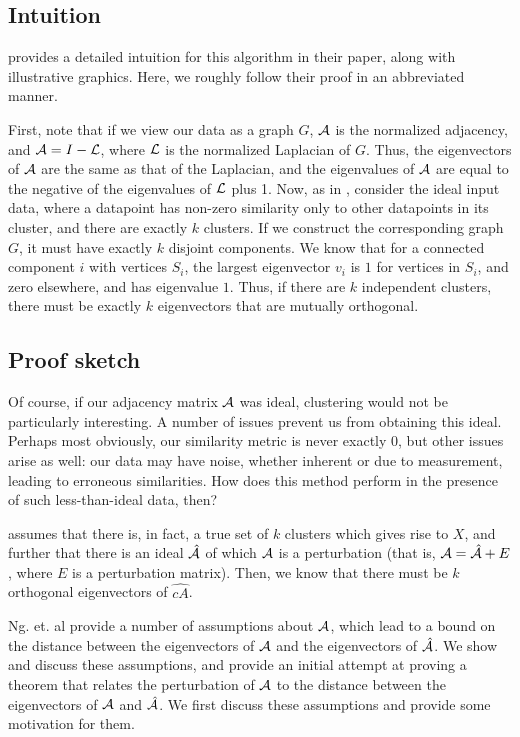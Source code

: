 \subsection{Intuition}
\cite{ng2002spectral} provides a detailed intuition for this algorithm in their paper,
along with illustrative graphics. Here, we roughly follow their proof in an
abbreviated manner.

First, note that if we view our data as a graph $G$, $\mathcal{A}$ is the normalized
adjacency, and $\mathcal{A} = I - \mathcal{L}$, where $\mathcal{L}$ is the normalized Laplacian of $G$.
Thus, the eigenvectors of $\mathcal{A}$ are the same as that of the Laplacian, and the
eigenvalues of $\mathcal{A}$ are equal to the negative of the eigenvalues of $\mathcal{L}$ plus
1. Now, as in \cite{ng2002spectral}, consider the ideal input data, where a
datapoint has non-zero similarity only to other datapoints in its cluster, and
there are exactly $k$ clusters. If we construct the corresponding graph $G$, it
must have exactly $k$ disjoint components. We know that for a connected
component $i$ with vertices $S_i$, the largest eigenvector $v_i$ is $1$ for
vertices in $S_i$, and zero elsewhere, and has eigenvalue $1$. Thus, if there
are $k$ independent clusters, there must be exactly $k$ eigenvectors that are
mutually orthogonal.

\subsection{Proof sketch}
Of course, if our adjacency matrix $\mathcal{A}$ was ideal, clustering would not be
particularly interesting. A number of issues prevent us from obtaining this
ideal. Perhaps most obviously, our similarity metric is never exactly $0$, but
other issues arise as well: our data may have noise, whether inherent or due
to measurement, leading to erroneous similarities. How does this method perform
in the presence of such less-than-ideal data, then?

\cite{ng2002spectral} assumes that there is, in fact, a true set of $k$ clusters
which gives rise to $X$, and further that there is an ideal $\hat{\mathcal{A}}$ of which
$\mathcal{A}$ is a perturbation (that is, $\mathcal{A} = \hat{\mathcal{A}} + E$, where $E$ is a
perturbation matrix). Then, we know that there must be $k$ orthogonal
eigenvectors of $\hat{cA}$.

Ng. et. al provide a number of assumptions about $\mathcal{A}$, which lead to a bound
on the distance between the eigenvectors of $\mathcal{A}$ and the eigenvectors of
$\hat{\mathcal{A}}$. We show and discuss these assumptions, and provide an initial
attempt at proving a theorem that relates the perturbation of $\mathcal{A}$ to the
distance between the eigenvectors of $\mathcal{A}$ and $\hat{\mathcal{A}}$. We first discuss
these assumptions and provide some motivation for them.

